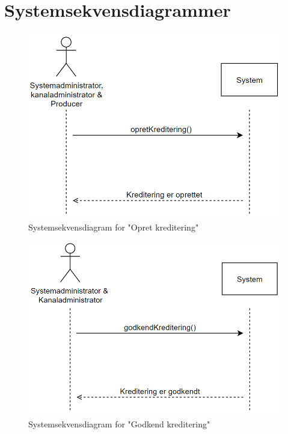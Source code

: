 \section{Systemsekvensdiagrammer}{\label{section: systemsekvensdiagrammer}}

\begin{figure}[H]
\centering
\includegraphics[scale=0.43]{figures/systemsekvensdiagrammer/opretKreditering.PNG}
\caption{Systemsekvensdiagram for "Opret kreditering"}
\label{fig:create_credit}
\end{figure}

\begin{figure}[H]
\centering
\includegraphics[scale=0.43]{figures/systemsekvensdiagrammer/godkendKreditering.PNG}
\caption{Systemsekvensdiagram for "Godkend kreditering"}
\label{fig:approve_credit}
\end{figure}

